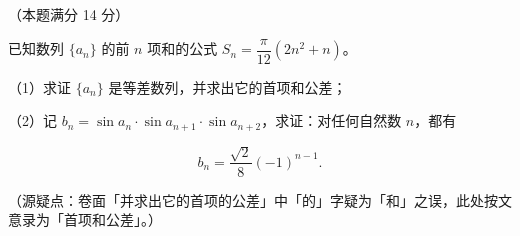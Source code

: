 \begin{question}
（本题满分 14 分）

已知数列 $\{a_n\}$ 的前 $n$ 项和的公式 $S_n=\dfrac{\pi}{12}(2n^2+n)$。

（1）求证 $\{a_n\}$ 是等差数列，并求出它的首项和公差；

（2）记 $b_n=\sin a_n\cdot\sin a_{n+1}\cdot\sin a_{n+2}$，求证：对任何自然数 $n$，都有

\nopagebreak[4]
\[
b_n=\frac{\sqrt2}{8}(-1)^{n-1}.
\]

（源疑点：卷面「并求出它的首项的公差」中「的」字疑为「和」之误，此处按文意录为「首项和公差」。）

\end{question}